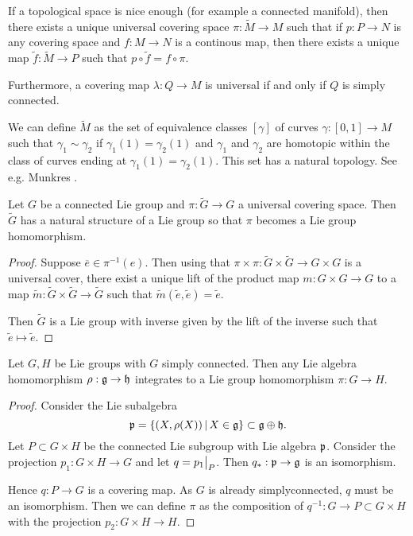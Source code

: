 \documentclass[11pt, english]{article}
\begin{document}
If a topological space is nice enough (for example a connected manifold), then there exists a unique universal covering space $\pi:\widetilde M \to M$ such that if $p:P \to N$ is any covering space and $f:M \to N$ is a continous map, then there exists a unique map $\widetilde f: \widetilde M \to P$ such that $p \circ \widetilde f = f \circ \pi$.

Furthermore, a covering map $\lambda: Q \to M$ is universal if and only if $Q$ is simply connected. 

We can define $\widetilde M$ as the set of equivalence classes $[\gamma]$ of curves $\gamma:[0,1] \to M$ such that $\gamma_1 \sim \gamma_2$  if $\gamma_1(1)=\gamma_2(1)$ and $\gamma_1$ and $\gamma_2$ are homotopic within the class of  curves ending at $\gamma_1(1)=\gamma_2(1)$. This set has a natural topology. See e.g. Munkres \cite{hatcher_algtop}.

\begin{prop}
Let $G$ be a connected Lie group and $\pi: \widetilde G \to G$ a universal covering space. Then $\widetilde G$ has a natural structure of a Lie group so that $\pi$ becomes a Lie group homomorphism.
\end{prop}

\begin{proof}
  Suppose $\overline e \in \pi^{-1}(e)$. Then using that $\pi \times \pi: \widetilde G \times \widetilde G \to G \times G$ is a universal cover, there exist a unique lift of the product map $m: G \times G \to G$ to a map $\widetilde m: \widetilde G \times \widetilde G \to \widetilde G$ such that $\widetilde m (\widetilde e, \widetilde e) = \widetilde e$.

Then $\widetilde G$ is a Lie group with inverse given by the lift of the inverse such that $\widetilde e \mapsto \widetilde e$.
\end{proof}

\begin{thm}
  Let $G,H$ be Lie groups with $G$ simply connected. Then any Lie algebra homomorphism $\rho:\mathfrak g \to \mathfrak h$ integrates to a Lie group homomorphism $\pi:G \to H$.
\end{thm}

\begin{proof}
  Consider the Lie subalgebra
$$
\mathfrak{p} = \{ (X,\rho(X)) \, | \, X \in \mathfrak g \} \subset \mathfrak g \oplus \mathfrak h.
$$
Let $P \subset G \times H$ be the connected Lie subgroup with Lie algebra $\mathfrak{p}$. Consider the projection $p_1: G \times H \to G$ and let $q = \restr{p_1}{P}$. Then $q_\ast : \mathfrak{p} \to \mathfrak g$ is an isomorphism. 

Hence $q:P \to G$ is a covering map. As $G$ is already simplyconnected, $q$ must be an isomorphism. Then we can define $\pi$ as the composition of $q^{-1}:G \to P \subset G \times H$ with the projection $p_2:G \times H \to H$.
\end{proof}
\end{document}
